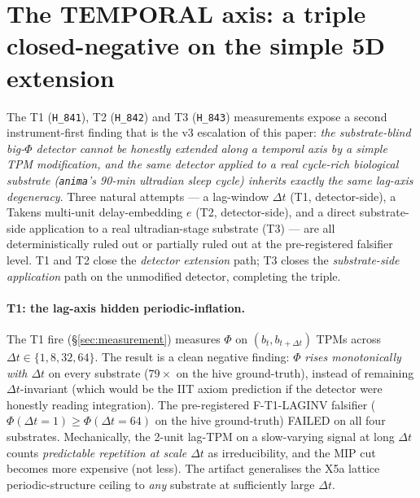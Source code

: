 \documentclass[11pt,a4paper]{article}
\begin{document}
\section{The TEMPORAL axis: a triple closed-negative on the simple 5D extension}
\label{sec:temporal}

The T1 (\texttt{H\_841}), T2 (\texttt{H\_842}) and T3 (\texttt{H\_843})
measurements expose a second instrument-first finding that is the v3
escalation of this paper: \emph{the substrate-blind big-$\Phi$ detector
cannot be honestly extended along a temporal axis by a simple TPM
modification, and the same detector applied to a real cycle-rich
biological substrate (\texttt{anima}'s 90-min ultradian sleep cycle)
inherits exactly the same lag-axis degeneracy}. Three natural attempts
--- a lag-window $\Delta t$ (T1, detector-side), a Takens multi-unit
delay-embedding $e$ (T2, detector-side), and a direct substrate-side
application to a real ultradian-stage substrate (T3) --- are all
deterministically ruled out or partially ruled out at the
pre-registered falsifier level. T1 and T2 close the \emph{detector
extension} path; T3 closes the \emph{substrate-side application} path
on the unmodified detector, completing the triple.

\paragraph{T1: the lag-axis hidden periodic-inflation.}
The T1 fire (\S\ref{sec:measurement}) measures
$\Phi$ on $(b_t, b_{t+\Delta t})$ TPMs across
$\Delta t \in\{1,8,32,64\}$. The result is a clean negative finding:
$\Phi$ \emph{rises monotonically with $\Delta t$} on every substrate
($79\times$ on the hive ground-truth), instead of remaining
$\Delta t$-invariant (which would be the IIT axiom prediction if the
detector were honestly reading integration). The pre-registered
F-T1-LAGINV falsifier ($\Phi(\Delta t=1) \ge \Phi(\Delta t=64)$ on
the hive ground-truth) FAILED on all four substrates. Mechanically,
the 2-unit lag-TPM on a slow-varying signal at long $\Delta t$ counts
\emph{predictable repetition at scale $\Delta t$} as irreducibility,
and the MIP cut becomes more expensive (not less). The artifact
generalises the X5a lattice periodic-structure ceiling to
\emph{any} substrate at sufficiently large $\Delta t$.
\end{document}
